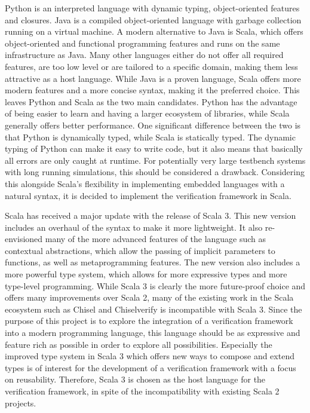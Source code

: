 Python is an interpreted language with dynamic typing, object-oriented features and closures. Java is a compiled
object-oriented language with garbage collection running on a virtual machine. A modern alternative to Java is Scala,
which offers object-oriented and functional programming features and runs on the same infrastructure as Java. Many
other languages either do not offer all required features, are too low level or are tailored to a specific domain,
making them less attractive as a host language. While Java is a proven language, Scala offers more modern features
and a more concise syntax, making it the preferred choice. This leaves Python and Scala as the two main candidates.
Python has the advantage of being easier to learn and having a larger ecosystem of libraries, while Scala generally
offers better performance. One significant difference between the two is that Python is dynamically typed, while
Scala is statically typed. The dynamic typing of Python can make it easy to write code, but it also means that
basically all errors are only caught at runtime. For potentially very large testbench systems with long running
simulations, this should be considered a drawback. Considering this alongside Scala's flexibility in implementing
embedded languages with a natural syntax, it is decided to implement the verification framework in Scala.

Scala has received a major update with the release of Scala 3. This new version includes an overhaul of the syntax to
make it more lightweight. It also re-envisioned many of the more advanced features of the language such as contextual
abstractions, which allow the passing of implicit parameters to functions, as well as metaprogramming features. The
new version also includes a more powerful type system, which allows for more expressive types and more type-level
programming. While Scala 3 is clearly the more future-proof choice and offers many improvements over Scala 2, many of
the existing work in the Scala ecosystem such as Chisel and Chiselverify is incompatible with Scala 3. Since the
purpose of this project is to explore the integration of a verification framework into a modern programming language,
this language should be as expressive and feature rich as possible in order to explore all possibilities. Especially
the improved type system in Scala 3 which offers new ways to compose and extend types is of interest for the
development of a verification framework with a focus on reusability. Therefore, Scala 3 is chosen as the host
language for the verification framework, in spite of the incompatibility with existing Scala 2 projects.

